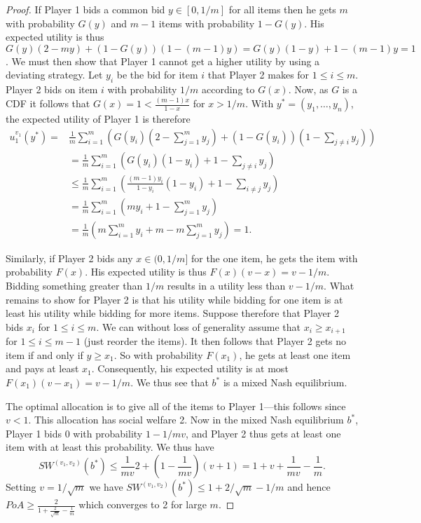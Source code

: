 \begin{proof}
   If Player 1 bids a common bid $ y \in [0, 1 /m] $ for all items then he gets $ m $ with probability $ G(y) $ and $ m - 1 $ items with probability $ 1 - G(y) $. His expected utility is thus $ G(y)(2 - my) + (1- G(y))(1 - (m-1)y) = G(y)(1-y) + 1 - (m - 1)y = 1 $. We must then show that Player 1 cannot get a higher utility by using a deviating strategy. Let $ y_i $ be the bid for item $ i $ that Player 2 makes for $ 1 \leq i \leq m $. Player 2 bids on item $ i $ with probability $ 1 /m $ according to $ G(x) $. Now, as $ G $ is a CDF it follows that $ G(x) = 1 < \frac{(m-1)x}{1 - x} $ for $ x > 1 /m $. With $ y^{*}=(y_1, \ldots, y_n) $, the expected utility of Player 1 is therefore
   \begin{align*}
     u_1^{v_1}(y^*) = &\frac{1}{m}\sum_{i = 1}^{m} \left( G(y_i)\left( 2 - \sum_{j = 1}^{m} y_j \right) + (1 - G(y_i)) \left( 1 - \sum_{j \neq i} y_j \right) \right) \\
                      &= \frac{1}{m} \sum_{i = 1}^{m} \left( G(y_i)(1 - y_i) + 1 - \sum_{j \neq i} y_j \right) \\
                      &\leq \frac{1}{m} \sum_{i = 1}^{m} \left( \frac{(m-1)y_i}{1 - y_i}(1 - y_i) + 1 - \sum_{i \neq j} y_j \right) \\
                      &= \frac{1}{m}\sum_{i = 1}^{m} \left( my_i + 1 - \sum_{j = 1}^{m} y_j \right) \\
                      &= \frac{1}{m}\left( m \sum_{i = 1}^{m} y_i + m - m \sum_{j = 1}^{m} y_j \right) = 1
   .\end{align*}


   Similarly, if Player 2 bids any $ x \in (0, 1 /m] $ for the one item, he gets the item with probability $ F(x) $. His expected utility is thus $ F(x)(v - x) = v - 1 /m $. Bidding something greater than $ 1 /m $ results in a utility less than $ v - 1 /m $. What remains to show for Player 2 is that his utility while bidding for one item is at least his utility while bidding for more items. Suppose therefore that Player 2 bids $ x_i $ for $ 1\leq i \leq m $. We can without loss of generality assume that $ x_i \geq x_{i+1} $ for $ 1\leq i\leq m-1 $ (just reorder the items). It then follows that Player 2 gets no item if and only if $ y \geq x_1 $. So with probability $ F(x_1) $, he gets at least one item and pays at least $ x_1 $. Consequently, his expected utility is at most $ F(x_1)(v - x_1) = v - 1 /m $. We thus see that $ b^{*} $ is a mixed Nash equilibrium.

   The optimal allocation is to give all of the items to Player 1---this follows since $ v<1 $. This allocation has social welfare 2. Now in the mixed Nash equilibrium $ b^* $, Player 1 bids $ 0 $ with probability $ 1 - 1 /mv $, and Player 2 thus gets at least one item with at least this probability. We thus have
   \begin{equation}
     SW^{(v_1, v_2)}(b^{*}) \leq \frac{1}{mv}2 + \left( 1 - \frac{1}{mv} \right)(v + 1) = 1 + v + \frac{1}{mv} - \frac{1}{m}.
   \end{equation}
   Setting $ v = 1 /\sqrt{m} $ we have $ SW^{(v_1, v_2)}(b^{*}) \leq 1 + 2 /\sqrt{m} - 1 /m $ and hence $ PoA \geq \frac{2}{1 + \frac{2}{\sqrt{m}} - \frac{1}{m}} $ which converges to 2 for large $ m $.
\end{proof}
